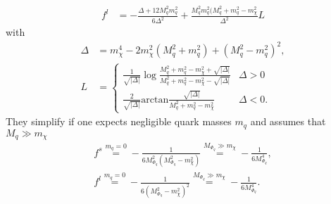 \begin{appendix}
\begin{align}
 f^l &=-\frac{\Delta+12M_q^2m_q^2}{6\Delta^2} + \frac{M_q^2m_q^2(M_q^2+m_q^2-m_\chi^2}{\Delta^2}L
\end{align}
with
\begin{align}
 \Delta &= m_\chi^4-2m_\chi^2(M_q^2+m_q^2) + (M_q^2-m_q^2)^2,\\
 L&= \begin{cases} \frac{1}{\sqrt{|\Delta|}}\log\frac{M_q^2+m_q^2-m_\chi^2+\sqrt{|\Delta|}}{M_q^2+m_q^2-m_\chi^2-\sqrt{|\Delta|}} & \Delta>0\\ 
		  \frac{2}{\sqrt{|\Delta|}}\text{arctan}\frac{\sqrt{|\Delta|}}{M_q^2+m_q^2-m_\chi^2} &\Delta<0.   
     \end{cases}
\end{align}
They simplify if one expects negligible quark masses $m_q$ and assumes that $M_q \gg m_\chi$
\begin{align}
 f^s \stackrel{m_q=0}{=} - \frac{1}{6M_{\Phi_q}^2\left(M_{\Phi_q}^2-m_\chi^2\right)} \stackrel{M_{\Phi_q}\gg m_\chi}{=} -\frac{1}{6M_{\Phi_q}^4},\\
 f^l \stackrel{m_q=0}{=} - \frac{1}{6\left(M_{\Phi_q}^2-m_\chi^2\right)^2}  \stackrel{M_{\Phi_q}\gg m_\chi}{=} -\frac{1}{6M_{\Phi_q}^4}.
\end{align}


\end{appendix}
